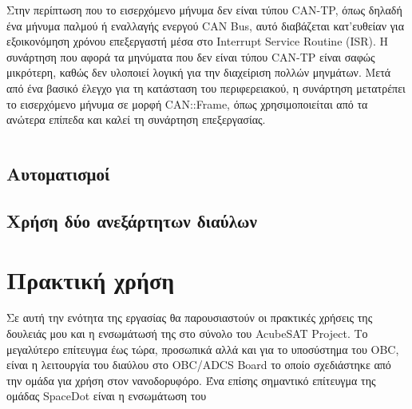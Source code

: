 \documentclass[a4paper,nobib,justified]{tufte-book}
\begin{document}
Στην περίπτωση που το εισερχόμενο μήνυμα δεν είναι τύπου CAN-TP, όπως δηλαδή ένα μήνυμα παλμού ή εναλλαγής ενεργού CAN Bus, αυτό διαβάζεται κατ'ευθείαν για εξοικονόμηση χρόνου επεξεργαστή μέσα στο Interrupt Service Routine (ISR). Η συνάρτηση που αφορά τα μηνύματα που δεν είναι τύπου CAN-TP είναι σαφώς μικρότερη, καθώς δεν υλοποιεί λογική για την διαχείριση πολλών μηνμάτων. Μετά από ένα βασικό έλεγχο για τη κατάσταση του περιφερειακού, η συνάρτηση μετατρέπει το εισερχόμενο μήνυμα σε μορφή CAN::Frame, όπως χρησιμοποιείται από τα ανώτερα επίπεδα και καλεί τη συνάρτηση επεξεργασίας.
\inputminted{c++}{code/examples/driver-non-tp-receiver.cpp}

\section{Αυτοματισμοί}

\section{Χρήση δύο ανεξάρτητων διαύλων}


\chapter{Πρακτική χρήση}
\label{usage}
Σε αυτή την ενότητα της εργασίας θα παρουσιαστούν οι πρακτικές χρήσεις της δουλειάς μου και η ενσωμάτωσή της στο σύνολο του AcubeSAT Project. Το μεγαλύτερο επίτευγμα έως τώρα, προσωπικά αλλά και για το υποσύστημα του OBC, είναι η λειτουργία του διαύλου στο OBC/ADCS Board το οποίο σχεδιάστηκε από την ομάδα για χρήση στον νανοδορυφόρο. Ένα επίσης σημαντικό επίτευγμα της ομάδας SpaceDot είναι η ενσωμάτωση του  
\end{document}

